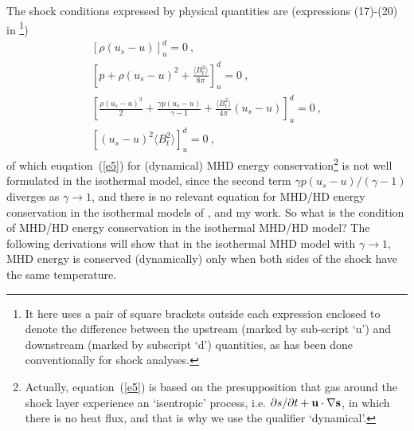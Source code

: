 \documentclass[fleqn,usenatbib]{mnras}
\begin{document}
The shock conditions expressed by physical quantities are (expressions (17)-(20) in \citet{wang2008dynamic}\footnote{It here uses a pair of square brackets outside each expression enclosed to denote the difference between the upstream (marked by sub-script `u') and downstream (marked by subscript `d') quantities, as has been done conventionally for shock analyses.})
\begin{gather}
\left[\rho\left(u_{s}-u\right)\right]_{u}^{d}=0\ ,\label{e3}\\
\left[p+\rho\left(u_{s}-u\right)^{2}+\frac{\langle B_{t}^{2}\rangle}{8\pi}\right]_{u}^{d}=0\ ,\label{e4}\\
\left[\frac{\rho\left(u_{s}-u\right)^{3}}{2}+\frac{\gamma p\left(u_{s}-u\right)}{\gamma-1}+\frac{\langle B_{t}^{2}\rangle}{4\pi}\left(u_{s}-u\right)\right]_{u}^{d}=0\ ,\label{e5}\\
\left[\left(u_{s}-u\right)^{2}\langle B_{t}^{2}\rangle\right]_{u}^{d}=0\ ,\label{e6}
\end{gather}
of which euqation~(\ref{e5}) for (dynamical) MHD energy conservation\footnote{Actually, equation~(\ref{e5}) is based on the presupposition that gas around the shock layer experience an `isentropic' process, i.e. $\partial s/\partial t+\bf{u}\cdot\nabla s$, in which there is no heat flux, and that is why we use the qualifier `dynamical'.} is not well formulated in the isothermal model, since the second term $\gamma p\left(u_{s}-u\right)/(\gamma-1)$ diverges as $\gamma\rightarrow 1$, and there is no relevant equation for MHD/HD energy conservation in the isothermal models of \citet{lou2014self}, \citet{yuLou2006} and my work. So what is the condition of MHD/HD energy conservation in the isothermal MHD/HD model? The following derivations will show that in the isothermal MHD model with $\gamma\rightarrow 1$, MHD energy is conserved (dynamically) only when both sides of the shock have the same temperature.
\end{document}
